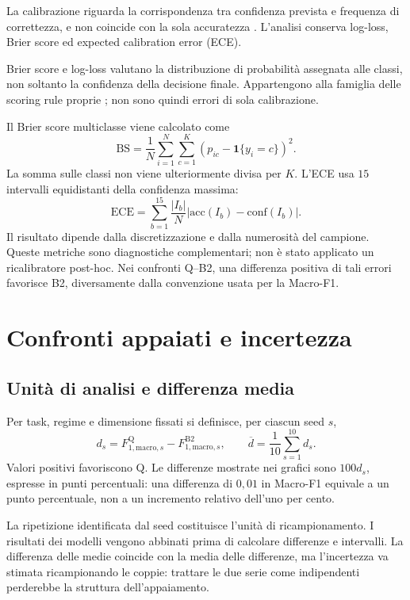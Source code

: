 La calibrazione riguarda la corrispondenza tra confidenza prevista
e frequenza di correttezza, e non coincide con la sola accuratezza
\cite{guo2017calibration}. L'analisi conserva log-loss, Brier score
ed expected calibration error (ECE).

Brier score e log-loss valutano la distribuzione di probabilità
assegnata alle classi, non soltanto la confidenza della decisione
finale. Appartengono alla famiglia delle scoring rule proprie
\cite{gneiting2007scoring}; non sono quindi errori di sola calibrazione.

Il Brier score multiclasse viene calcolato come
\begin{equation}
  \mathrm{BS}=\frac{1}{N}\sum_{i=1}^{N}\sum_{c=1}^{K}
     \left(p_{ic}-\mathbf 1\{y_i=c\}\right)^2.
\end{equation}
La somma sulle classi non viene ulteriormente divisa per \(K\).
L'ECE usa \(15\) intervalli equidistanti della confidenza massima:
\[
 \mathrm{ECE}=\sum_{b=1}^{15}
 \frac{|I_b|}{N}
 \left|\mathrm{acc}(I_b)-\mathrm{conf}(I_b)\right|.
\]
Il risultato dipende dalla discretizzazione e dalla numerosità del
campione. Queste metriche sono diagnostiche complementari; non è
stato applicato un ricalibratore post-hoc. Nei confronti Q--B2,
una differenza positiva di tali errori favorisce B2, diversamente
dalla convenzione usata per la Macro-F1.

\section{Confronti appaiati e incertezza}
\label{sec:statistica}

\subsection{Unità di analisi e differenza media}

Per task, regime e dimensione fissati si definisce, per ciascun seed \(s\),
\begin{equation}
  d_s=F^{\mathrm Q}_{1,\mathrm{macro},s}
      -F^{\mathrm{B2}}_{1,\mathrm{macro},s},
  \qquad
  \overline d=\frac{1}{10}\sum_{s=1}^{10}d_s.
  \label{eq:delta-appaiato}
\end{equation}
Valori positivi favoriscono Q. Le differenze mostrate nei grafici
sono \(100d_s\), espresse in punti percentuali: una differenza di
\(0{,}01\) in Macro-F1 equivale a un punto percentuale, non a un
incremento relativo dell'uno per cento.

La ripetizione identificata dal seed costituisce l'unità di
ricampionamento. I risultati dei modelli vengono abbinati prima
di calcolare differenze e intervalli. La differenza delle medie
coincide con la media delle differenze, ma l'incertezza va stimata
ricampionando le coppie: trattare le due serie come indipendenti
perderebbe la struttura dell'appaiamento.

